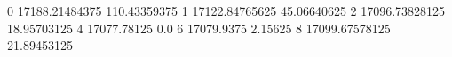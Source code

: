 0 17188.21484375 110.43359375
1 17122.84765625 45.06640625
2 17096.73828125 18.95703125
4 17077.78125 0.0
6 17079.9375 2.15625
8 17099.67578125 21.89453125
